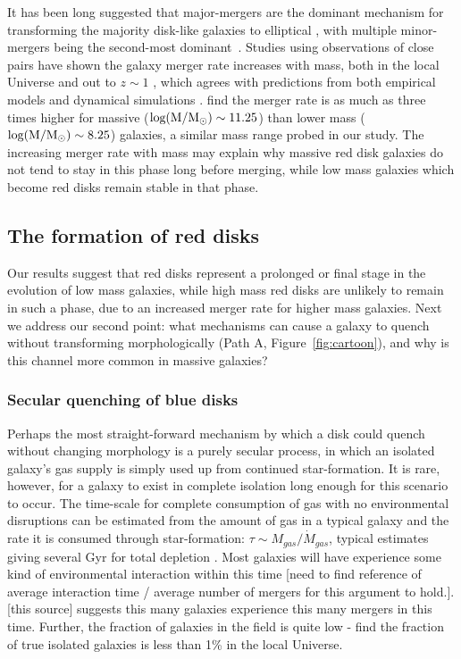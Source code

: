 \documentclass[useAMS,usenatbib]{mn2e}
\begin{document}
It has been long suggested that major-mergers are the dominant mechanism for transforming the majority disk-like galaxies to elliptical \citep{Toomre1977,Schweizer1982,Schweizer1990}, with multiple minor-mergers being the second-most dominant~\citep{Bundy2009,Hopkins2010b}. Studies using observations of close pairs have shown the galaxy merger rate increases with mass, both in the local Universe \citep{Xu2004,Patton2008,Domingue2009,Robotham2014,Casteels2014} and out to $z\sim1$ \citep{Xu2012,Bundy2009}, which agrees with predictions from both empirical models and dynamical simulations \citep{Hopkins2010a,Hopkins2010b,Maller2006}. \citet{Casteels2014} find the merger rate is as much as three times higher for massive ($\rm log(M/M_{\odot})\sim11.25$) than lower mass ($\rm log(M/M_{\odot})\sim8.25$) galaxies, a similar mass range probed in our study. The increasing merger rate with mass may explain why massive red disk galaxies do not tend to stay in this phase long before merging, while low mass galaxies which become red disks remain stable in that phase. 


\subsection{The formation of red disks}

Our results suggest that red disks represent a prolonged or final stage in the evolution of low mass galaxies, while high mass red disks are unlikely to remain in such a phase, due to an increased merger rate for higher mass galaxies. Next we address our second point: what mechanisms can cause a galaxy to quench without transforming morphologically (Path A, Figure~\ref{fig:cartoon}), and why is this channel more common in massive galaxies? 
 
\subsubsection{Secular quenching of blue disks}

Perhaps the most straight-forward mechanism by which a disk could quench without changing morphology is a purely secular process, in which an isolated galaxy's gas supply is simply used up from continued star-formation. It is rare, however, for a galaxy to exist in complete isolation long enough for this scenario to occur. The time-scale for complete consumption of gas with no environmental disruptions can be estimated from the amount of gas in a typical galaxy and the rate it is consumed through star-formation: $\tau \sim M_{gas}/\dot{M}_{gas}$, typical estimates giving several Gyr for total depletion \citep{Larson1980,Kaviraj2011,Hatton2003,Schawinski2014}. Most galaxies will have experience some kind of environmental interaction within this time [need to find reference of average interaction time / average number of mergers for this argument to hold.]. [this source] suggests this many galaxies experience this many mergers in this time. Further, the fraction of galaxies in the field is quite low - \citet{Tully1987} find the fraction of true isolated galaxies is less than 1\% in the local Universe. 
\end{document}
